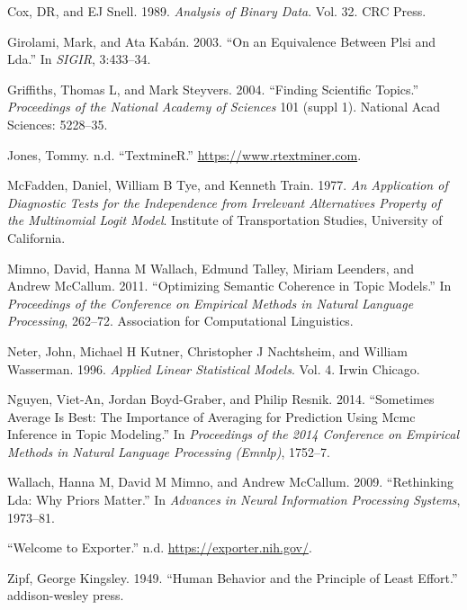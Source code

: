 \documentclass[conference,final,]{IEEEtran}
\begin{document}
\leavevmode\hypertarget{ref-cox1989analysis}{}%
Cox, DR, and EJ Snell. 1989. \emph{Analysis of Binary Data}. Vol. 32.
CRC Press.

\leavevmode\hypertarget{ref-girolami2003equivalence}{}%
Girolami, Mark, and Ata Kabán. 2003. ``On an Equivalence Between Plsi
and Lda.'' In \emph{SIGIR}, 3:433--34.

\leavevmode\hypertarget{ref-griffiths2004finding}{}%
Griffiths, Thomas L, and Mark Steyvers. 2004. ``Finding Scientific
Topics.'' \emph{Proceedings of the National Academy of Sciences} 101
(suppl 1). National Acad Sciences: 5228--35.

\leavevmode\hypertarget{ref-textminer}{}%
Jones, Tommy. n.d. ``TextmineR.'' \url{https://www.rtextminer.com}.

\leavevmode\hypertarget{ref-mcfadden1977application}{}%
McFadden, Daniel, William B Tye, and Kenneth Train. 1977. \emph{An
Application of Diagnostic Tests for the Independence from Irrelevant
Alternatives Property of the Multinomial Logit Model}. Institute of
Transportation Studies, University of California.

\leavevmode\hypertarget{ref-mimno2011optimizing}{}%
Mimno, David, Hanna M Wallach, Edmund Talley, Miriam Leenders, and
Andrew McCallum. 2011. ``Optimizing Semantic Coherence in Topic
Models.'' In \emph{Proceedings of the Conference on Empirical Methods in
Natural Language Processing}, 262--72. Association for Computational
Linguistics.

\leavevmode\hypertarget{ref-neter1996applied}{}%
Neter, John, Michael H Kutner, Christopher J Nachtsheim, and William
Wasserman. 1996. \emph{Applied Linear Statistical Models}. Vol. 4. Irwin
Chicago.

\leavevmode\hypertarget{ref-nguyen2014sometimes}{}%
Nguyen, Viet-An, Jordan Boyd-Graber, and Philip Resnik. 2014.
``Sometimes Average Is Best: The Importance of Averaging for Prediction
Using Mcmc Inference in Topic Modeling.'' In \emph{Proceedings of the
2014 Conference on Empirical Methods in Natural Language Processing
(Emnlp)}, 1752--7.

\leavevmode\hypertarget{ref-wallach2009rethinking}{}%
Wallach, Hanna M, David M Mimno, and Andrew McCallum. 2009. ``Rethinking
Lda: Why Priors Matter.'' In \emph{Advances in Neural Information
Processing Systems}, 1973--81.

\leavevmode\hypertarget{ref-nih}{}%
``Welcome to Exporter.'' n.d. \url{https://exporter.nih.gov/}.

\leavevmode\hypertarget{ref-zipf1949human}{}%
Zipf, George Kingsley. 1949. ``Human Behavior and the Principle of Least
Effort.'' addison-wesley press.
\end{document}
